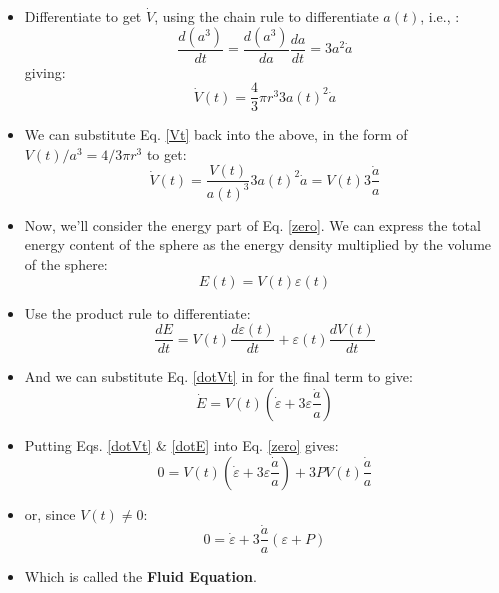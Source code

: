 \documentclass[11pt]{article}
\begin{document}
\begin{itemize}
\begin{equation}
\end{equation}
\item Differentiate to get $\dot{V}$, using the chain rule to differentiate $a(t)$, i.e., :
\begin{equation}
    \frac{d(a^3)}{dt} = \frac{d(a^3)}{da}\frac{da}{dt} = 3a^2\dot{a}
\end{equation}
giving:
\begin{equation}
    \dot{V}(t) = \frac{4}{3}\pi r^3 3a(t)^2\dot{a}
\end{equation}
\item We can substitute Eq. \ref{Vt} back into the above, in the form of $V(t)/a^3 = 4/3 \pi r^3$ to get:
\begin{equation}
    \label{dotVt}
    \dot{V}(t) = \frac{V(t)}{a(t)^3} 3a(t)^2\dot{a} = V(t) 3\frac{\dot{a}}{a}
\end{equation}
\item Now, we'll consider the energy part of Eq. \ref{zero}. We can express the total energy content of the sphere as the energy density multiplied by the volume of the sphere:
\begin{equation}
    E(t) = V(t)\varepsilon(t)
\end{equation}
\item Use the product rule to differentiate:
\begin{equation}
    \frac{dE}{dt} = V(t)\frac{d\varepsilon(t)}{dt} + \varepsilon(t)\frac{dV(t)}{dt}
\end{equation}
\item And we can substitute Eq. \ref{dotVt} in for the final term to give:
\begin{equation}
    \label{dotE}
    \dot{E} = V(t)\left(\dot{\varepsilon} + 3\varepsilon\frac{\dot{a}}{a}\right)
\end{equation}
\item Putting Eqs. \ref{dotVt} \& \ref{dotE} into Eq. \ref{zero} gives: 
\begin{equation}
    0 = V(t)\left(\dot{\varepsilon} + 3\varepsilon\frac{\dot{a}}{a}\right) + 3PV(t)\frac{\dot{a}}{a}
\end{equation}
\item or, since $V(t)\ne 0$:
\begin{equation}
    0 = \dot{\varepsilon} + 3\frac{\dot{a}}{a}\left(\varepsilon + P\right)
\end{equation}
\item Which is called the {\bf Fluid Equation}.
\end{itemize}
\end{document}
